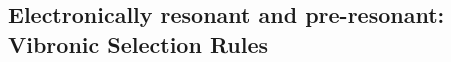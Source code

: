 \documentclass[aip, jcp, reprint, onecolumn]{revtex4-2}
\begin{document}

\subsection{Electronically resonant and pre-resonant: Vibronic Selection Rules}
\end{document}
